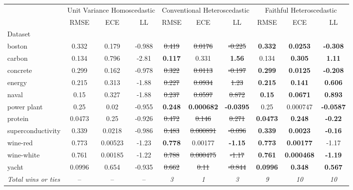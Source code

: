 \begin{tabular}{l|ccc|ccc|ccc}
\toprule
 & \multicolumn{3}{|c}{Unit Variance Homoscedastic} & \multicolumn{3}{|c}{Conventional Heteroscedastic} & \multicolumn{3}{|c}{Faithful Heteroscedastic} \\
 & RMSE & ECE & LL & RMSE & ECE & LL & RMSE & ECE & LL \\
Dataset &  &  &  &  &  &  &  &  &  \\
\midrule
boston & 0.332 & 0.179 & -0.988 & \sout{0.419} & \sout{0.0176} & \sout{-0.225} & \textbf{0.332} & \textbf{0.0253} & \textbf{-0.308} \\
carbon & 0.134 & 0.796 & -2.81 & \textbf{0.117} & 0.331 & \textbf{1.56} & 0.134 & \textbf{0.305} & \textbf{1.11} \\
concrete & 0.299 & 0.162 & -0.978 & \sout{0.322} & \sout{0.0113} & \sout{-0.197} & \textbf{0.299} & \textbf{0.0125} & \textbf{-0.208} \\
energy & 0.215 & 0.313 & -1.88 & \sout{0.227} & \sout{0.0934} & \sout{1.23} & \textbf{0.215} & \textbf{0.141} & \textbf{0.606} \\
naval & 0.15 & 0.327 & -1.88 & \sout{0.237} & \sout{0.0597} & \sout{0.872} & \textbf{0.15} & \textbf{0.0671} & \textbf{0.893} \\
power plant & 0.25 & 0.02 & -0.955 & \textbf{0.248} & \textbf{0.000682} & \textbf{-0.0395} & 0.25 & 0.000747 & \textbf{-0.0587} \\
protein & 0.0473 & 0.25 & -0.926 & \sout{0.472} & \sout{0.146} & \sout{0.271} & \textbf{0.0473} & \textbf{0.248} & \textbf{-0.22} \\
superconductivity & 0.339 & 0.0218 & -0.986 & \sout{0.483} & \sout{0.000891} & \sout{-0.096} & \textbf{0.339} & \textbf{0.0023} & \textbf{-0.16} \\
wine-red & 0.773 & 0.00523 & -1.23 & \textbf{0.778} & 0.00177 & \textbf{-1.15} & \textbf{0.773} & \textbf{0.00177} & -1.17 \\
wine-white & 0.761 & 0.00185 & -1.22 & \sout{0.788} & \sout{0.000475} & \sout{-1.17} & \textbf{0.761} & \textbf{0.000468} & \textbf{-1.19} \\
yacht & 0.0996 & 0.654 & -0.935 & \sout{0.662} & \sout{0.11} & \sout{-0.844} & \textbf{0.0996} & \textbf{0.348} & \textbf{0.567} \\
\textit{{Total wins or ties}} & -- & -- & -- & \textit{3} & \textit{1} & \textit{3} & \textit{9} & \textit{10} & \textit{10} \\
\bottomrule
\end{tabular}

